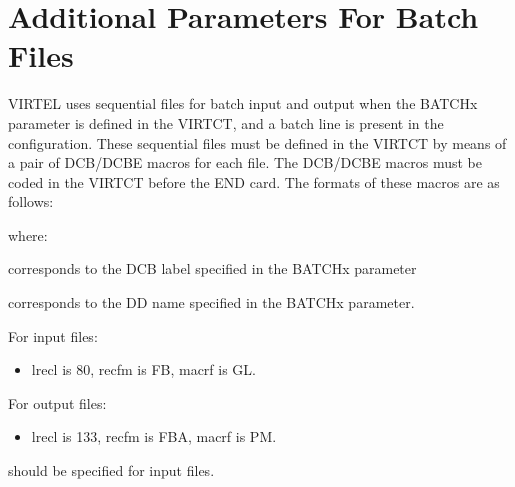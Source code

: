 \documentclass[letterpaper,10pt,english]{sphinxmanual}
\begin{document}
\section{Additional Parameters For Batch Files}
\label{\detokenize{Installation_Guide:additional-parameters-for-batch-files}}\label{\detokenize{Installation_Guide:index-146}}
\sphinxAtStartPar
VIRTEL uses sequential files for batch input and output when the BATCHx parameter is defined in the VIRTCT, and a batch line is present in the configuration. These sequential files must be defined in the VIRTCT by means of a pair of DCB/DCBE macros for each file. The DCB/DCBE macros must be coded in the VIRTCT before the END card. The formats of these macros are as follows:

\begin{sphinxVerbatim}[commandchars=\\\{\}]
                             
  
\end{sphinxVerbatim}

\sphinxAtStartPar
where:

\sphinxAtStartPar
{} \sphinxhyphen{} corresponds to the DCB label specified in the BATCHx parameter

\sphinxAtStartPar
{} \sphinxhyphen{} corresponds to the DD name specified in the BATCHx parameter.

\sphinxAtStartPar
For input files:
\begin{itemize}
\item {} 
\sphinxAtStartPar
lrecl is 80, recfm is FB, macrf is GL.

\end{itemize}

\sphinxAtStartPar
For output files:
\begin{itemize}
\item {} 
\sphinxAtStartPar
lrecl is 133, recfm is FBA, macrf is PM.

\end{itemize}

\sphinxAtStartPar
{} \sphinxhyphen{} should be specified for input files.
\end{document}
